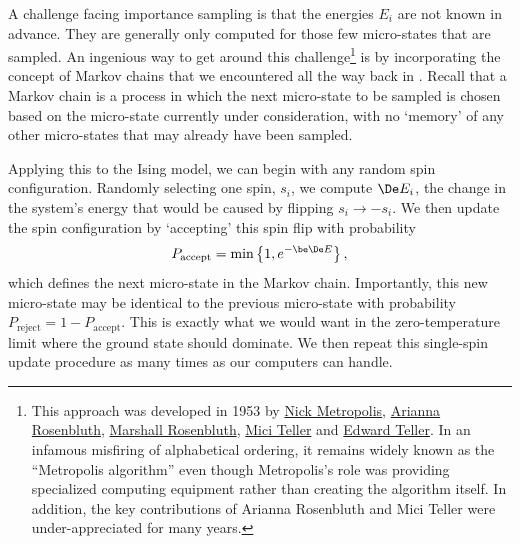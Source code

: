 A challenge facing importance sampling is that the energies $E_i$ are not known in advance.
They are generally only computed for those few micro-states that are sampled.
An ingenious way to get around this challenge\footnote{This approach was developed in 1953 by \href{https://en.wikipedia.org/wiki/Nicholas_Metropolis}{Nick Metropolis}, \href{https://en.wikipedia.org/wiki/Arianna_W._Rosenbluth}{Arianna Rosenbluth}, \href{https://en.wikipedia.org/wiki/Marshall_Rosenbluth}{Marshall Rosenbluth}, \href{https://en.wikipedia.org/wiki/Augusta_H._Teller}{Mici Teller} and \href{https://en.wikipedia.org/wiki/Edward_Teller}{Edward Teller}.  In an infamous misfiring of alphabetical ordering, it remains widely known as the ``Metropolis algorithm'' even though Metropolis's role was providing specialized computing equipment rather than creating the algorithm itself.  In addition, the key contributions of Arianna Rosenbluth and Mici Teller were under-appreciated for many years.} is by incorporating the concept of Markov chains that we encountered all the way back in .
Recall that a Markov chain is a process in which the next micro-state to be sampled is chosen based on the micro-state currently under consideration, with no `memory' of any other micro-states that may already have been sampled.

Applying this to the Ising model, we can begin with any random spin configuration.
Randomly selecting one spin, $s_i$, we compute $\De E_i$, the change in the system's energy that would be caused by flipping $s_i \to -s_i$.
We then update the spin configuration by `accepting' this spin flip with probability
\begin{equation}
  \label{eq:MRTprob}
  P_{\text{accept}} = \mbox{min}\left\{1, e^{-\be \De E}\right\},
\end{equation}
which defines the next micro-state in the Markov chain.
Importantly, this new micro-state may be identical to the previous micro-state with probability $P_{\text{reject}} = 1 - P_{\text{accept}}$.
This is exactly what we would want in the zero-temperature limit where the ground state should dominate.
We then repeat this single-spin update procedure as many times as our computers can handle.


